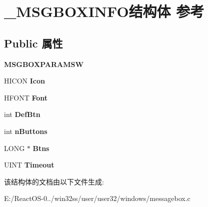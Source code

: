 \hypertarget{struct___m_s_g_b_o_x_i_n_f_o}{}\section{\+\_\+\+M\+S\+G\+B\+O\+X\+I\+N\+F\+O结构体 参考}
\label{struct___m_s_g_b_o_x_i_n_f_o}
\subsection*{Public 属性}
\begin{DoxyCompactItemize}
\item 
\mbox{\label{struct___m_s_g_b_o_x_i_n_f_o_ab5c754551c73096d1a3c70ba450cca80}} 
{\bfseries M\+S\+G\+B\+O\+X\+P\+A\+R\+A\+M\+SW}
\item 
\mbox{\label{struct___m_s_g_b_o_x_i_n_f_o_afd7606474111651040716758b884a6ec}} 
H\+I\+C\+ON {\bfseries Icon}
\item 
\mbox{\label{struct___m_s_g_b_o_x_i_n_f_o_a040f11ff45716f719a918c3d92550f1e}} 
H\+F\+O\+NT {\bfseries Font}
\item 
\mbox{\label{struct___m_s_g_b_o_x_i_n_f_o_a4a279eb680a7115230a38b365dfc73f7}} 
int {\bfseries Def\+Btn}
\item 
\mbox{\label{struct___m_s_g_b_o_x_i_n_f_o_a20eb22564d45d14217e97b217f538edf}} 
int {\bfseries n\+Buttons}
\item 
\mbox{\label{struct___m_s_g_b_o_x_i_n_f_o_a8ec02a9794be7fb23a84f2dde0a00938}} 
L\+O\+NG $\ast$ {\bfseries Btns}
\item 
\mbox{\label{struct___m_s_g_b_o_x_i_n_f_o_a4d09088b0510e012d329325915196bc2}} 
U\+I\+NT {\bfseries Timeout}
\end{DoxyCompactItemize}


该结构体的文档由以下文件生成\+:\begin{DoxyCompactItemize}
\item 
E\+:/\+React\+O\+S-\/0../win32ss/user/user32/windows/messagebox.\+c\end{DoxyCompactItemize}
